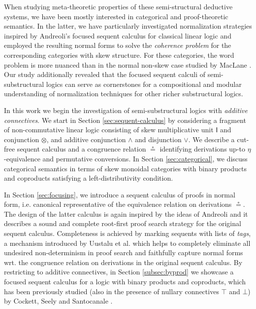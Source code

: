 \documentclass[submission,copyright,creativecommons]{eptcs}
\theoremstyle{definition}
\newcommand{\ot}{\otimes}
\newcommand{\I}{\mathsf{I}}
\begin{document}
When studying meta-theoretic properties of these semi-structural deductive systems, we have been mostly interested in categorical and proof-theoretic semantics. In the latter, we have particularly investigated normalization strategies inspired by Andreoli's focused sequent calculus for classical linear logic \cite{andreoli:logic:1992} and employed the resulting normal forms to solve the \emph{coherence problem} for the corresponding categories with skew structure. For these categories, the word problem is more nuanced than in the normal non-skew case studied by MacLane \cite{maclane1963natural}. Our study additionally revealed that the focused sequent calculi of semi-substructural logics can serve as cornerstones for a compositional and modular understanding of normalization techniques for other richer substructural logics.

In this work we begin the investigation of semi-substructural logics with \emph{additive connectives}. We start in Section \ref{sec:sequent-calculus} by considering a fragment of non-commutative linear logic consisting of skew multiplicative unit $\I$ and conjunction $\ot$, and additive conjunction $\land$ and disjunction $\lor$. We describe a cut-free sequent calculus and a congruence relation $\circeq$ identifying derivations up-to $\eta$-equivalence and permutative conversions. In Section \ref{sec:categorical}, we discuss categorical semantics in terms of skew monoidal categories with binary products and coproducts satisfying a left-distributivity condition.

In Section \ref{sec:focusing}, we introduce a sequent calculus of proofs in normal form, i.e. canonical representative of the equivalence relation on derivations $\circeq$. The design of the latter calculus is again inspired by the ideas of Andreoli and it describes a sound and complete root-first proof search strategy for the original sequent calculus. Completeness is achieved by marking sequents with lists of \emph{tags}, a mechanism introduced by Uustalu et al. \cite{UVW:protsn}
which helps to completely eliminate all undesired non-determinism in proof search and faithfully capture normal forms wrt. the congruence relation on derivations in the original sequent calculus.
By restricting to additive connectives, in Section \ref{subsec:byprod} we showcase a focused sequent calculus for a logic with binary products and coproducts, which has been previously studied (also in the presence of nullary connectives $\top$ and $\bot$) by Cockett, Seely and Santocanale \cite{CS01,CS09}.
\end{document}
